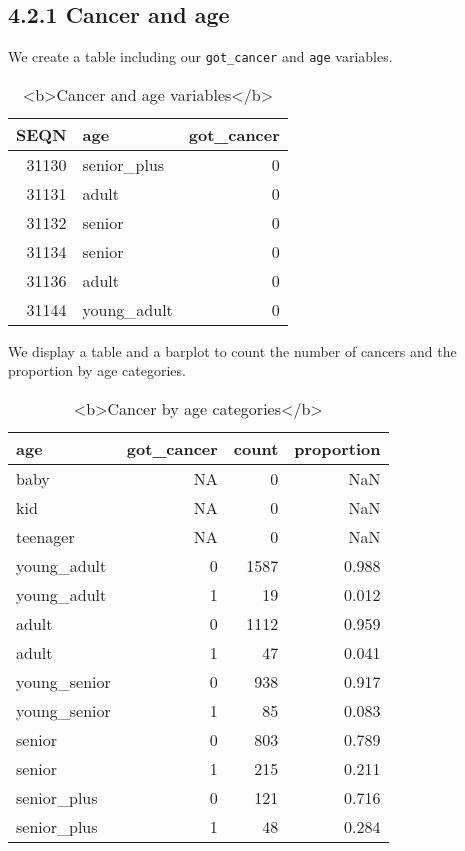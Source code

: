 \documentclass[
]{article}
\begin{document}
\hypertarget{cancer-and-age}{%
\subsection{4.2.1 Cancer and age}\label{cancer-and-age}}

We create a table including our \texttt{got\_cancer} and \texttt{age}
variables.

\begin{table}

\caption{\label{tab:unnamed-chunk-93}<b>Cancer and age variables</b>}
\centering
\begin{tabular}[t]{r|l|r}
\hline
SEQN & age & got\_cancer\\
\hline
31130 & senior\_plus & 0\\
\hline
31131 & adult & 0\\
\hline
31132 & senior & 0\\
\hline
31134 & senior & 0\\
\hline
31136 & adult & 0\\
\hline
31144 & young\_adult & 0\\
\hline
\end{tabular}
\end{table}

We display a table and a barplot to count the number of cancers and the
proportion by age categories.

\begin{table}

\caption{\label{tab:unnamed-chunk-94}<b>Cancer by age categories</b>}
\centering
\begin{tabular}[t]{l|r|r|r}
\hline
age & got\_cancer & count & proportion\\
\hline
baby & NA & 0 & NaN\\
\hline
kid & NA & 0 & NaN\\
\hline
teenager & NA & 0 & NaN\\
\hline
young\_adult & 0 & 1587 & 0.988\\
\hline
young\_adult & 1 & 19 & 0.012\\
\hline
adult & 0 & 1112 & 0.959\\
\hline
adult & 1 & 47 & 0.041\\
\hline
young\_senior & 0 & 938 & 0.917\\
\hline
young\_senior & 1 & 85 & 0.083\\
\hline
senior & 0 & 803 & 0.789\\
\hline
senior & 1 & 215 & 0.211\\
\hline
senior\_plus & 0 & 121 & 0.716\\
\hline
senior\_plus & 1 & 48 & 0.284\\
\hline
\end{tabular}
\end{table}
\end{document}

